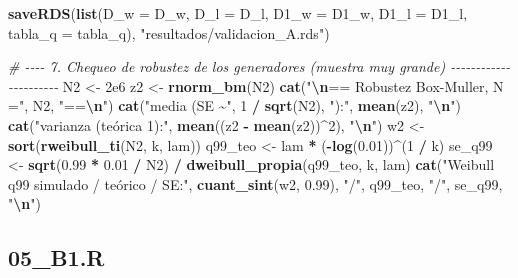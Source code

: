 \documentclass[
  spanish,
]{article}
\newenvironment{Shaded}{\begin{snugshade}}{\end{snugshade}}
\newcommand{\AttributeTok}[1]{\textcolor[rgb]{0.13,0.29,0.53}{#1}}
\newcommand{\CommentTok}[1]{\textcolor[rgb]{0.56,0.35,0.01}{\textit{#1}}}
\newcommand{\DecValTok}[1]{\textcolor[rgb]{0.00,0.00,0.81}{#1}}
\newcommand{\FloatTok}[1]{\textcolor[rgb]{0.00,0.00,0.81}{#1}}
\newcommand{\FunctionTok}[1]{\textcolor[rgb]{0.13,0.29,0.53}{\textbf{#1}}}
\newcommand{\NormalTok}[1]{#1}
\newcommand{\OtherTok}[1]{\textcolor[rgb]{0.56,0.35,0.01}{#1}}
\newcommand{\SpecialCharTok}[1]{\textcolor[rgb]{0.81,0.36,0.00}{\textbf{#1}}}
\newcommand{\StringTok}[1]{\textcolor[rgb]{0.31,0.60,0.02}{#1}}
\begin{document}
\begin{Shaded}
\begin{Highlighting}[]
\FunctionTok{saveRDS}\NormalTok{(}\FunctionTok{list}\NormalTok{(}\AttributeTok{D\_w =}\NormalTok{ D\_w, }\AttributeTok{D\_l =}\NormalTok{ D\_l, }\AttributeTok{D1\_w =}\NormalTok{ D1\_w, }\AttributeTok{D1\_l =}\NormalTok{ D1\_l, }\AttributeTok{tabla\_q =}\NormalTok{ tabla\_q),}
        \StringTok{"resultados/validacion\_A.rds"}\NormalTok{)}

\CommentTok{\# {-}{-}{-}{-} 7. Chequeo de robustez de los generadores (muestra muy grande) {-}{-}{-}{-}{-}{-}{-}{-}{-}{-}{-}{-}{-}{-}{-}{-}{-}{-}{-}{-}{-}{-}}
\NormalTok{N2 }\OtherTok{\textless{}{-}} \FloatTok{2e6}
\NormalTok{z2 }\OtherTok{\textless{}{-}} \FunctionTok{rnorm\_bm}\NormalTok{(N2)}
\FunctionTok{cat}\NormalTok{(}\StringTok{"}\SpecialCharTok{\textbackslash{}n}\StringTok{== Robustez Box{-}Muller, N ="}\NormalTok{, N2, }\StringTok{"==}\SpecialCharTok{\textbackslash{}n}\StringTok{"}\NormalTok{)}
\FunctionTok{cat}\NormalTok{(}\StringTok{"media (SE \textasciitilde{}"}\NormalTok{, }\DecValTok{1} \SpecialCharTok{/} \FunctionTok{sqrt}\NormalTok{(N2), }\StringTok{"):"}\NormalTok{, }\FunctionTok{mean}\NormalTok{(z2), }\StringTok{"}\SpecialCharTok{\textbackslash{}n}\StringTok{"}\NormalTok{)}
\FunctionTok{cat}\NormalTok{(}\StringTok{"varianza (teórica 1):"}\NormalTok{, }\FunctionTok{mean}\NormalTok{((z2 }\SpecialCharTok{{-}} \FunctionTok{mean}\NormalTok{(z2))}\SpecialCharTok{\^{}}\DecValTok{2}\NormalTok{), }\StringTok{"}\SpecialCharTok{\textbackslash{}n}\StringTok{"}\NormalTok{)}
\NormalTok{w2 }\OtherTok{\textless{}{-}} \FunctionTok{sort}\NormalTok{(}\FunctionTok{rweibull\_ti}\NormalTok{(N2, k, lam))}
\NormalTok{q99\_teo }\OtherTok{\textless{}{-}}\NormalTok{ lam }\SpecialCharTok{*}\NormalTok{ (}\SpecialCharTok{{-}}\FunctionTok{log}\NormalTok{(}\FloatTok{0.01}\NormalTok{))}\SpecialCharTok{\^{}}\NormalTok{(}\DecValTok{1} \SpecialCharTok{/}\NormalTok{ k)}
\NormalTok{se\_q99  }\OtherTok{\textless{}{-}} \FunctionTok{sqrt}\NormalTok{(}\FloatTok{0.99} \SpecialCharTok{*} \FloatTok{0.01} \SpecialCharTok{/}\NormalTok{ N2) }\SpecialCharTok{/} \FunctionTok{dweibull\_propia}\NormalTok{(q99\_teo, k, lam)}
\FunctionTok{cat}\NormalTok{(}\StringTok{"Weibull q99 simulado / teórico / SE:"}\NormalTok{, }\FunctionTok{cuant\_sint}\NormalTok{(w2, }\FloatTok{0.99}\NormalTok{), }\StringTok{"/"}\NormalTok{, q99\_teo, }\StringTok{"/"}\NormalTok{, se\_q99, }\StringTok{"}\SpecialCharTok{\textbackslash{}n}\StringTok{"}\NormalTok{)}
\end{Highlighting}
\end{Shaded}

\subsection{05\_B1.R}\label{b1.r}
\end{document}
